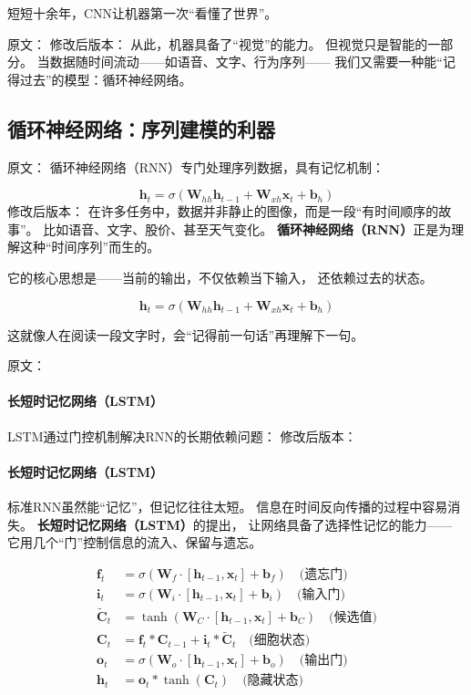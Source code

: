 短短十余年，CNN让机器第一次“看懂了世界”。



原文：
修改后版本：
从此，机器具备了“视觉”的能力。  
但视觉只是智能的一部分。  
当数据随时间流动——如语音、文字、行为序列——  
我们又需要一种能“记得过去”的模型：循环神经网络。

\subsection{循环神经网络：序列建模的利器}

原文：
循环神经网络（RNN）专门处理序列数据，具有记忆机制：

$$\mathbf{h}_t = \sigma(\mathbf{W}_{hh} \mathbf{h}_{t-1} + \mathbf{W}_{xh} \mathbf{x}_t + \mathbf{b}_h)$$
修改后版本：
在许多任务中，数据并非静止的图像，而是一段“有时间顺序的故事”。  
比如语音、文字、股价、甚至天气变化。  
\textbf{循环神经网络（RNN）}正是为理解这种“时间序列”而生的。  

它的核心思想是——当前的输出，不仅依赖当下输入，  
还依赖过去的状态。  

$$\mathbf{h}_t = \sigma(\mathbf{W}_{hh} \mathbf{h}_{t-1} + \mathbf{W}_{xh} \mathbf{x}_t + \mathbf{b}_h)$$

这就像人在阅读一段文字时，会“记得前一句话”再理解下一句。



原文：
\paragraph{长短时记忆网络（LSTM）}
LSTM通过门控机制解决RNN的长期依赖问题：
修改后版本：
\paragraph{长短时记忆网络（LSTM）}  
标准RNN虽然能“记忆”，但记忆往往太短。  
信息在时间反向传播的过程中容易消失。  
\textbf{长短时记忆网络（LSTM）}的提出，  
让网络具备了选择性记忆的能力——  
它用几个“门”控制信息的流入、保留与遗忘。

\begin{align}
\mathbf{f}_t &= \sigma(\mathbf{W}_f \cdot [\mathbf{h}_{t-1}, \mathbf{x}_t] + \mathbf{b}_f) \quad \text{(遗忘门)} \\
\mathbf{i}_t &= \sigma(\mathbf{W}_i \cdot [\mathbf{h}_{t-1}, \mathbf{x}_t] + \mathbf{b}_i) \quad \text{(输入门)} \\
\tilde{\mathbf{C}}_t &= \tanh(\mathbf{W}_C \cdot [\mathbf{h}_{t-1}, \mathbf{x}_t] + \mathbf{b}_C) \quad \text{(候选值)} \\
\mathbf{C}_t &= \mathbf{f}_t * \mathbf{C}_{t-1} + \mathbf{i}_t * \tilde{\mathbf{C}}_t \quad \text{(细胞状态)} \\
\mathbf{o}_t &= \sigma(\mathbf{W}_o \cdot [\mathbf{h}_{t-1}, \mathbf{x}_t] + \mathbf{b}_o) \quad \text{(输出门)} \\
\mathbf{h}_t &= \mathbf{o}_t * \tanh(\mathbf{C}_t) \quad \text{(隐藏状态)}
\end{align}


